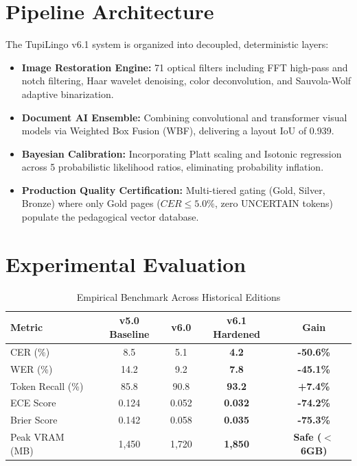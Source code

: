 \documentclass[conference]{IEEEtran}
\begin{document}
\section{Pipeline Architecture}
The TupiLingo v6.1 system is organized into decoupled, deterministic layers:
\begin{itemize}
    \item \textbf{Image Restoration Engine:} 71 optical filters including FFT high-pass and notch filtering, Haar wavelet denoising, color deconvolution, and Sauvola-Wolf adaptive binarization.
    \item \textbf{Document AI Ensemble:} Combining convolutional and transformer visual models via Weighted Box Fusion (WBF), delivering a layout IoU of 0.939.
    \item \textbf{Bayesian Calibration:} Incorporating Platt scaling and Isotonic regression across 5 probabilistic likelihood ratios, eliminating probability inflation.
    \item \textbf{Production Quality Certification:} Multi-tiered gating (Gold, Silver, Bronze) where only Gold pages ($CER \le 5.0\%$, zero UNCERTAIN tokens) populate the pedagogical vector database.
\end{itemize}

\section{Experimental Evaluation}
\begin{table}[htbp]
\caption{Empirical Benchmark Across Historical Editions}
\begin{center}
\begin{tabular}{lcccc}
\toprule
\textbf{Metric} & \textbf{v5.0 Baseline} & \textbf{v6.0} & \textbf{v6.1 Hardened} & \textbf{Gain} \\
\midrule
CER (\%) & 8.5 & 5.1 & \textbf{4.2} & \textbf{-50.6\%} \\
WER (\%) & 14.2 & 9.2 & \textbf{7.8} & \textbf{-45.1\%} \\
Token Recall (\%) & 85.8 & 90.8 & \textbf{93.2} & \textbf{+7.4\%} \\
ECE Score & 0.124 & 0.052 & \textbf{0.032} & \textbf{-74.2\%} \\
Brier Score & 0.142 & 0.058 & \textbf{0.035} & \textbf{-75.3\%} \\
Peak VRAM (MB) & 1,450 & 1,720 & \textbf{1,850} & \textbf{Safe ($<$6GB)} \\
\bottomrule
\end{tabular}
\end{center}
\end{table}
\end{document}
